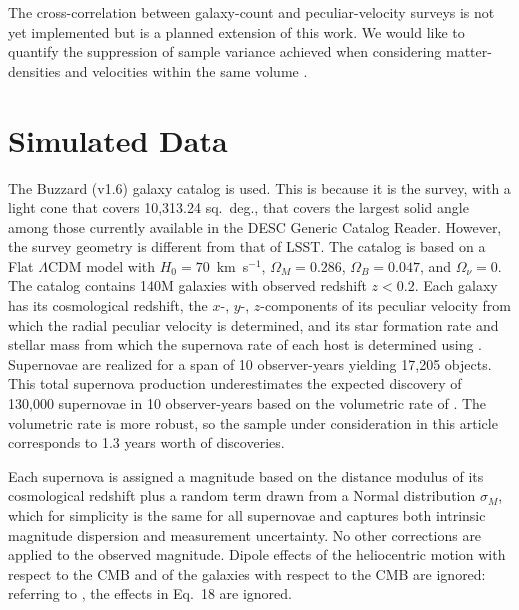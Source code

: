 \documentclass{aastex62}   	%
\begin{document}
The cross-correlation between galaxy-count and peculiar-velocity surveys is not yet implemented but is a planned extension of this work.  We would like to
quantify the suppression of sample variance achieved when considering matter-densities and velocities 
within the same volume \citep{2007PhRvL..99h1301G}.

\section{Simulated Data}
The Buzzard (v1.6) galaxy catalog is used.  This is because it is the survey, with a light cone that covers 10,313.24 sq.~deg., that covers
the largest solid angle among those currently available
in the DESC Generic Catalog Reader.  However,
the survey geometry is different
from that of LSST.  The catalog is based on a Flat $\Lambda$CDM model with $H_0=70$~km~s$^{-1}$,  $\Omega_M=0.286$, $\Omega_B=0.047$, and
$\Omega_\nu=0$.
The catalog contains 140M galaxies with observed redshift $z<0.2$.
Each galaxy has its cosmological redshift, the $x$-, $y$-, $z$-components of its peculiar velocity from which
the radial peculiar velocity is determined, and its
star formation rate and stellar mass from which the
supernova rate of each host is determined using 
\citet{2012ApJ...755...61S}.  Supernovae are realized for a span of 10 observer-years yielding 17,205 objects.  This total supernova
production underestimates the expected discovery of 130,000 supernovae in 10 observer-years based on the volumetric
rate of \citet{2010ApJ...713.1026D}.  The volumetric rate is more robust, so the sample under consideration in this article
corresponds to 1.3 years worth of discoveries. 

Each supernova is assigned a magnitude based on the distance modulus of its cosmological
redshift plus a random term drawn from a Normal distribution $\sigma_M$, which for simplicity is the same for all supernovae and captures both
intrinsic magnitude dispersion and measurement uncertainty.  No other corrections are applied to the observed magnitude.  Dipole effects of the heliocentric
motion with respect to the CMB and of the galaxies with respect to the CMB  are ignored: referring to
\citet{2011ApJ...741...67D}, the effects in Eq.~18 are ignored.
\end{document}
